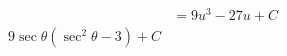 \documentclass[preview]{standalone}
\begin{document}
\begin{align*}
&=9u^3-27u+C \\9\sec\theta(\sec^2\theta-3)+C \\
\end{align*}
\end{document}
